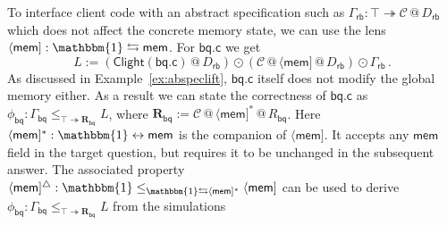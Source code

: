 \documentclass[acmsmall,screen,review,anonymous]{acmart}
\newcommand{\kw}[1]{\ensuremath{ \mathsf{#1} }}
\newcommand{\lensarrow}{\leftrightarrows}
\newcommand{\companion}{
  node[sct] {\tikz\draw[-Stealth] (0,0);}
}
\begin{document}
\begin{example} \label{ex:abspecref} %

To interface client code with an abstract specification such as
$\Gamma_\kw{rb} : \top \twoheadrightarrow \mathcal{C} \mathbin@ D_\kw{rb}$
which does not affect the concrete memory state,
we can use the lens
$\langle \kw{mem} ] : \mathbbm{1} \leftrightarrows \kw{mem}$.
For $\kw{bq.c}$ we get
\[
    L :=
    (\kw{Clight}(\kw{bq.c}) \mathbin@ D_\kw{rb}) \odot
    (\mathcal{C} \mathbin@ \langle \kw{mem} ] \mathbin@ D_\kw{rb}) \odot
    \Gamma_\kw{rb} \,.
\]
As discussed in Example~\ref{ex:abspeclift},
$\kw{bq.c}$ itself does not modify the global memory either.
As a result we can state the correctness of $\kw{bq.c}$ as
$
  \phi_\kw{bq} :
  \Gamma_\kw{bq} \le_{\top \twoheadrightarrow \mathbf{R}_\kw{bq}} L
$,
where
$\mathbf{R}_\kw{bq} :=
 \mathcal{C} \mathbin@ \langle \kw{mem} ]^* \mathbin@ R_\kw{bq}$.
%
Here %
$\langle \kw{mem} ]^* : \mathbbm{1} \leftrightarrow \kw{mem}$
is the companion of $\langle \kw{mem} ]$.
It accepts any $\kw{mem}$ field in the target question,
but requires it to be unchanged in the subsequent answer.
The associated property
$
  \langle \kw{mem} ]^\triangle :
    \mathbbm{1}
    \le_{\mathbbm{1} \lensarrow \langle \kw{mem} ]^*}
    \langle \kw{mem} ]
$
can be used to derive
$
  \phi_\kw{bq} :
  \Gamma_\kw{bq} \le_{\top \twoheadrightarrow \mathbf{R}_\kw{bq}} L
$
from the simulations
\[
\]
\end{example}
\end{document}
